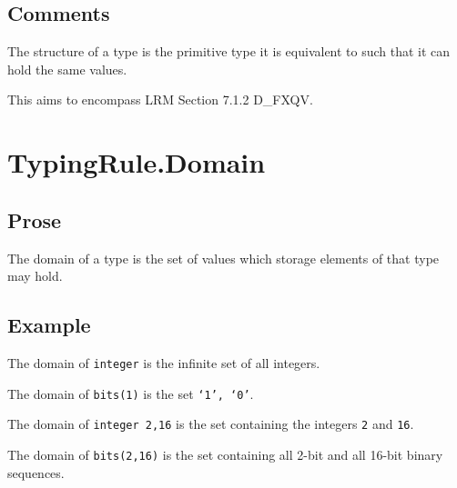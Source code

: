 \documentclass{book}
\begin{document}
\begin{emptyformal}
\end{emptyformal}
    \subsection{Comments}
    The structure of a type is the primitive type it is equivalent to such that
    it can hold the same values. 

    This aims to encompass LRM Section 7.1.2 D\_FXQV.

\section{TypingRule.Domain}

  \subsection{Prose}
  The domain of a type is the set of values which storage elements of that type
may hold.

\begin{comment}
ROMAN: explain where this is used. For example, for static evaluation of expressions.}
\end{comment}

\begin{comment}
ROMAN: move the following into the issues file.

I think that 3.4.2 and 7.1.3 contradict each other when it comes to under-constrained integers. If the domain of the under-constrained integer is a proper superset of every well-constrained integer, it follows that this domain is a superset of Z. Therefore, it cannot be a proper subset of Z - the domain of the unconstrained integer. Furthermore, just having the under-constrained integer with all the distinctions in the rules, is very confusing to any potential ASL developer.
\end{comment}

  \subsection{Example}
  The domain of \texttt{integer} is the infinite set of all integers.

  The domain of \texttt{bits(1)} is the set \texttt{{‘1’, ‘0’}}.

  The domain of \texttt{integer {2,16}} is the set containing the integers \texttt{2} and \texttt{16}.

  The domain of \texttt{bits({2,16})} is the set containing all 2-bit and all 16-bit binary sequences.
\end{document}

